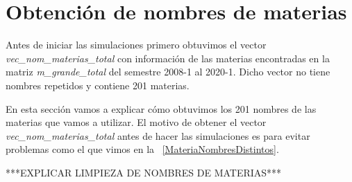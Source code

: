 \section{Obtención de nombres de materias}

Antes de iniciar las simulaciones primero obtuvimos el vector \textit{vec\_nom\_materias\_total} con información de las materias encontradas en la matriz \textit{m\_grande\_total} del semestre 2008-1 al 2020-1. Dicho vector  no tiene nombres repetidos y contiene 201 materias.

En esta sección vamos a explicar cómo obtuvimos los 201 nombres de las materias que vamos a utilizar. El motivo de obtener el vector \textit{vec\_nom\_materias\_total} antes de hacer las simulaciones es para evitar problemas como el que vimos en la \figurename{~\ref{MateriaNombresDistintos}}.


***EXPLICAR LIMPIEZA DE NOMBRES DE MATERIAS***


